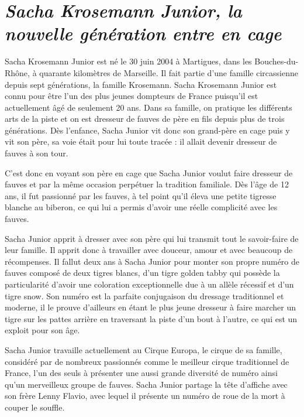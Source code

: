 \section*{\textit{Sacha Krosemann Junior, la nouvelle génération entre en cage}}
{}

Sacha Krosemann Junior est né le 30 juin 2004 à Martigues, dans les Bouches-du-Rhône, à quarante kilomètres de Marseille. Il fait partie d'une famille circassienne depuis sept générations, la famille Krosemann. Sacha Krosemann Junior est connu pour être l'un des plus jeunes dompteurs de France puisqu'il est actuellement âgé de seulement 20 ans. Dans sa famille, on pratique les différents arts de la piste et on est dresseur de fauves de père en fils depuis plus de trois générations. Dès l'enfance, Sacha Junior vit donc son grand-père en cage puis y vit son père, sa voie était pour lui toute tracée : il allait devenir dresseur de fauves à son tour.

C'est donc en voyant son père en cage que Sacha Junior voulut faire dresseur de fauves et par la même occasion perpétuer la tradition familiale. Dès l'âge de 12 ans, il fut passionné par les fauves, à tel point qu'il éleva une petite tigresse blanche au biberon, ce qui lui a permis d'avoir une réelle complicité avec les fauves.

Sacha Junior apprit à dresser avec son père qui lui transmit tout le savoir-faire de leur famille. Il apprit donc à travailler avec douceur, amour et avec beaucoup de récompenses. Il fallut deux ans à Sacha Junior pour monter son propre numéro de fauves composé de deux tigres blancs, d'un tigre golden tabby qui possède la particularité d'avoir une coloration exceptionnelle due à un allèle récessif et d'un tigre snow. Son numéro est la parfaite conjugaison du dressage traditionnel et moderne, il le prouve d'ailleurs en étant le plus jeune dresseur à faire marcher un tigre sur les pattes arrière en traversant la piste d'un bout à l'autre, ce qui est un exploit pour son âge.

Sacha Junior travaille actuellement au Cirque Europa, le cirque de sa famille, considéré par de nombreux passionnés comme le meilleur cirque traditionnel de France, l'un des seuls à présenter une aussi grande diversité de numéro ainsi qu'un merveilleux groupe de fauves. Sacha Junior partage la tête d'affiche avec son frère Lenny Flavio, avec lequel il présente un numéro de roue de la mort à couper le souffle.

